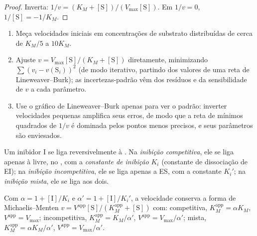 \begin{proof}
Inverta: $1/v = (K_M + [\mathrm S])/(V_{\max}[\mathrm S])$. Em $1/v = 0$, $1/[\mathrm S] = -1/K_M$.
\end{proof}

\begin{method}\label{met:b3:complex-kinetics:mm-fit}
\begin{enumerate}
  \item Meça velocidades iniciais em concentrações de substrato distribuídas de
        cerca de $K_M/5$ a $10K_M$.
  \item Ajuste $v = V_{\max}[\mathrm S]/(K_M + [\mathrm S])$ diretamente, minimizando $\sum(v_i - v(\mathrm S_i))^2$ (de modo
        iterativo, partindo dos valores de uma reta de Lineweaver--Burk); as
        incertezas-padrão vêm dos resíduos e da sensibilidade de $v$ a cada
        parâmetro.
  \item Use o gráfico de Lineweaver--Burk apenas para ver o padrão: inverter
        velocidades pequenas amplifica seus erros, de modo que a reta de mínimos
        quadrados de $1/v$ é dominada pelos pontos menos precisos, e seus parâmetros
        são enviesados.
\end{enumerate}
\end{method}

\begin{definition}[Inibição]\label{def:b3:complex-kinetics:inhibition}
Um inibidor I se liga reversivelmente à . Na \emph{inibição
competitiva}, ele se liga apenas à  livre, no
, com a \emph{constante de inibição} $K_i$
(constante de dissociação de EI); na \emph{inibição incompetitiva},
ele se liga apenas a ES, com a constante $K_i'$; na \emph{inibição
mista}, ele se liga aos dois.
\end{definition}

\begin{proposition}\label{prop:b3:complex-kinetics:inhibition-laws}
Com $\alpha = 1 + [\mathrm I]/K_i$ e $\alpha' = 1 + [\mathrm I]/K_i'$, a velocidade conserva a forma de
Michaelis--Menten $v = V^{\mathrm{app}}[\mathrm S]/(K_M^{\mathrm{app}} + [\mathrm S])$ com: competitiva,
$K_M^{\mathrm{app}} = \alpha K_M$, $V^{\mathrm{app}} = V_{\max}$; incompetitiva, $K_M^{\mathrm{app}} = K_M/\alpha'$, $V^{\mathrm{app}} =
V_{\max}/\alpha'$; mista, $K_M^{\mathrm{app}} = \alpha K_M/\alpha'$, $V^{\mathrm{app}} = V_{\max}/\alpha'$.
\end{proposition}

